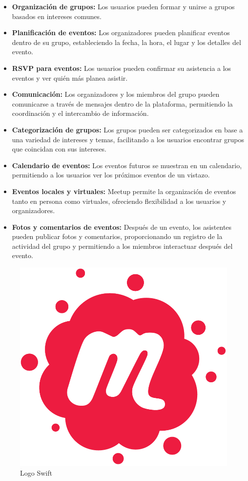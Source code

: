 \begin{itemize}
  \item \textbf{Organización de grupos:} Los usuarios pueden formar y unirse a grupos basados en intereses comunes.
  \item \textbf{Planificación de eventos:} Los organizadores pueden planificar eventos dentro de su grupo, estableciendo la fecha, la hora, el lugar y los detalles del evento.
  \item \textbf{RSVP para eventos:} Los usuarios pueden confirmar su asistencia a los eventos y ver quién más planea asistir.
  \item \textbf{Comunicación:} Los organizadores y los miembros del grupo pueden comunicarse a través de mensajes dentro de la plataforma, permitiendo la coordinación y el intercambio de información.
  \item \textbf{Categorización de grupos:} Los grupos pueden ser categorizados en base a una variedad de intereses y temas, facilitando a los usuarios encontrar grupos que coincidan con sus intereses.
  \item \textbf{Calendario de eventos:} Los eventos futuros se muestran en un calendario, permitiendo a los usuarios ver los próximos eventos de un vistazo.
  \item \textbf{Eventos locales y virtuales:} Meetup permite la organización de eventos tanto en persona como virtuales, ofreciendo flexibilidad a los usuarios y organizadores.
  \item \textbf{Fotos y comentarios de eventos:} Después de un evento, los asistentes pueden publicar fotos y comentarios, proporcionando un registro de la actividad del grupo y permitiendo a los miembros interactuar después del evento.
\end{itemize}
\begin{figure}[H]
        \centering
        \includegraphics[width=.5\linewidth]{images/Meetup_Logo.png}
        \caption{Logo Swift}
        \label{fig:logoSwift}
    \end{figure}

